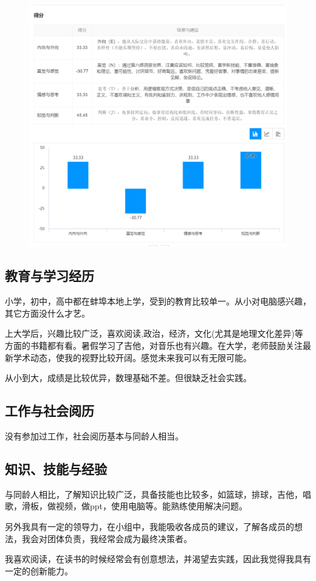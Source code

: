 \documentclass{article}
\begin{document}
\begin{figure}[H]
	\centering
	\includegraphics[width=0.8\linewidth]{性格测试2}
	\caption{}
	\label{fig:2}
\end{figure}


\subsection{教育与学习经历}
小学，初中，高中都在蚌埠本地上学，受到的教育比较单一。从小对电脑感兴趣，其它方面没什么才艺。\par
上大学后，兴趣比较广泛，喜欢阅读,政治，经济，文化(尤其是地理文化差异)等方面的书籍都有看。暑假学习了吉他，对音乐也有兴趣。在大学，老师鼓励关注最新学术动态，使我的视野比较开阔。感觉未来我可以有无限可能。\par
从小到大，成绩是比较优异，数理基础不差。但很缺乏社会实践。
\subsection{工作与社会阅历}
没有参加过工作，社会阅历基本与同龄人相当。\par
\subsection{知识、技能与经验}
与同龄人相比，了解知识比较广泛，具备技能也比较多，如篮球，排球，吉他，唱歌，滑板，做视频，做ppt，使用电脑等。能熟练使用解决问题。\par
另外我具有一定的领导力，在小组中，我能吸收各成员的建议，了解各成员的想法，我会对团体负责，我经常会成为最终决策者。\par
我喜欢阅读，在读书的时候经常会有创意想法，并渴望去实践，因此我觉得我具有一定的创新能力。\par
\end{document}
